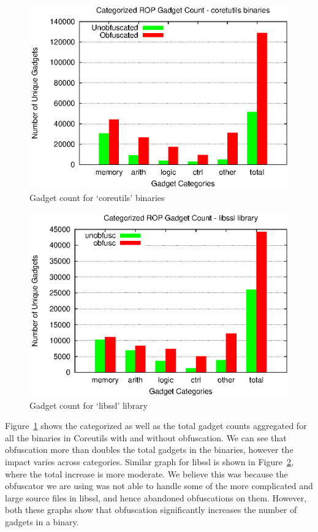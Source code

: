 \begin{figure}[h]
    \includegraphics[width=\linewidth]{figures/coretutils-aggregate.eps}
    \captionsetup{font=footnotesize, labelfont=bf, justification=centering}
    \caption{Gadget count for `coreutils' binaries}
    \label{fig:coreutil}
\end{figure}

\begin{figure}[h]
    \includegraphics[width=\linewidth]{figures/libssl.eps}
    \captionsetup{font=footnotesize, labelfont=bf, justification=centering}
    \caption{Gadget count for `libssl' library}
    \label{fig:libssl}
\end{figure}

Figure~\ref{fig:coreutil} shows the categorized as well as the total 
gadget counts aggregated for all the binaries in Coreutils with and 
without obfuscation. We can see that obfuscation more than doubles the 
total gadgets in the binaries, however the impact varies across 
categories. Similar graph for libssl is shown in Figure~\ref{fig:libssl}, 
where the total increase is more moderate. We believe this was because the 
obfuscator we are using was not able to handle some of the more 
complicated and large source files in libssl, and hence abandoned 
obfuscations on them. However, both these graphs show that obfuscation 
significantly increases the number of gadgets in a binary.

